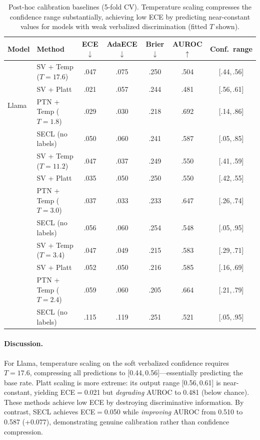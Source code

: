 \begin{table}[h]
\centering
\caption{Post-hoc calibration baselines (5-fold CV). 
Temperature scaling compresses the confidence range substantially,
achieving low ECE by predicting near-constant values for models with
weak verbalized discrimination (fitted $T$ shown).}
\label{tab:posthoc}
\small
\begin{tabular}{@{}llccccc@{}}
\toprule
\textbf{Model} & \textbf{Method}
  & \textbf{ECE}$\downarrow$ & \textbf{AdaECE}$\downarrow$
  & \textbf{Brier}$\downarrow$ & \textbf{AUROC}$\uparrow$ 
  & \textbf{Conf.\ range} \\
\midrule
\multirow{4}{*}{Llama}
  & SV + Temp ($T{=}17.6$)  & .047 & .075 & .250 & .504 & [.44,\,.56] \\
  & SV + Platt              & .021 & .057 & .244 & .481 & [.56,\,.61] \\
  & PTN + Temp ($T{=}1.8$)  & .029 & .030 & .218 & .692 & [.14,\,.86] \\
  & SECL (no labels)        & .050 & .060 & .241 & .587 & [.05,\,.85] \\
\addlinespace
\multirow{4}{*}{Gemma}
  & SV + Temp ($T{=}11.2$)  & .047 & .037 & .249 & .550 & [.41,\,.59] \\
  & SV + Platt              & .035 & .050 & .250 & .550 & [.42,\,.55] \\
  & PTN + Temp ($T{=}3.0$)  & .037 & .033 & .233 & .647 & [.26,\,.74] \\
  & SECL (no labels)        & .056 & .060 & .254 & .548 & [.05,\,.95] \\
\addlinespace
\multirow{4}{*}{Phi}
  & SV + Temp ($T{=}3.4$)   & .047 & .049 & .215 & .583 & [.29,\,.71] \\
  & SV + Platt              & .052 & .050 & .216 & .585 & [.16,\,.69] \\
  & PTN + Temp ($T{=}2.4$)  & .059 & .060 & .205 & .664 & [.21,\,.79] \\
  & SECL (no labels)        & .115 & .119 & .251 & .521 & [.05,\,.95] \\
\bottomrule
\end{tabular}
\end{table}

\paragraph{Discussion.}
For Llama, temperature scaling on the soft verbalized confidence requires 
$T{=}17.6$, compressing all predictions to [0.44,\,0.56]---essentially 
predicting the base rate.
Platt scaling is more extreme: its output range [0.56,\,0.61] is near-constant,
yielding ECE$=$0.021 but \emph{degrading} AUROC to 0.481 (below chance).
These methods achieve low ECE by destroying discriminative information.
By contrast, SECL achieves ECE$=$0.050 while \emph{improving} AUROC
from 0.510 to 0.587 (+0.077), demonstrating genuine calibration rather
than confidence compression.

